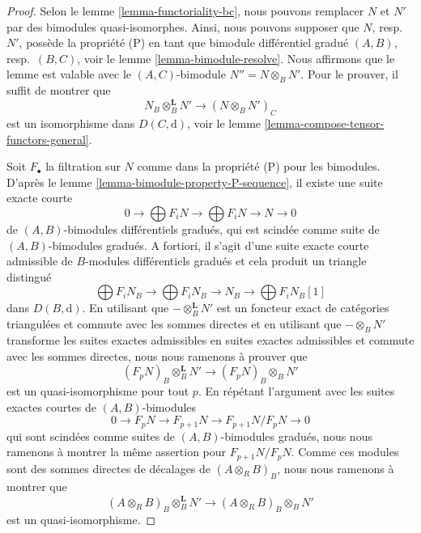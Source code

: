 \begin{proof}
Selon le lemme \ref{lemma-functoriality-bc}, nous pouvons remplacer $N$ et $N'$ par
des bimodules quasi-isomorphes. Ainsi, nous pouvons supposer que $N$, resp.\ $N'$,
possède la propriété (P) en tant que bimodule différentiel gradué $(A, B)$,
resp.\ $(B, C)$,
voir le lemme \ref{lemma-bimodule-resolve}. Nous affirmons que le
lemme est valable avec le $(A, C)$-bimodule $N'' = N \otimes_B
N'$. Pour le prouver, il suffit de montrer que
$$
N_B \otimes_B^\mathbf{L} N' \longrightarrow (N \otimes_B N')_C
$$
est un isomorphisme dans $D(C, \text{d})$,
voir le lemme \ref{lemma-compose-tensor-functors-general}.

\medskip\noindent
Soit $F_\bullet$ la filtration sur $N$ comme dans la propriété (P) pour les bimodules.
D'après le lemme
\ref{lemma-bimodule-property-P-sequence}, il existe une suite exacte courte
$$
0 \to
\bigoplus\nolimits F_iN \to
\bigoplus\nolimits F_iN \to N \to 0
$$
de $(A, B)$-bimodules différentiels gradués, qui est scindée comme suite
de $(A, B)$-bimodules gradués. A fortiori, il s'agit d'une suite exacte
courte admissible de $B$-modules différentiels gradués et cela produit un triangle
distingué
$$
\bigoplus\nolimits F_iN_B \to
\bigoplus\nolimits F_iN_B \to N_B \to
\bigoplus\nolimits F_iN_B[1]
$$
dans $D(B, \text{d})$. En utilisant que $- \otimes_B^\mathbf{L} N'$
est un foncteur exact de catégories triangulées et commute avec les
sommes directes et en utilisant que $- \otimes_B N'$ transforme les
suites exactes admissibles en suites exactes admissibles et commute
avec les sommes directes, nous nous ramenons à prouver
que
$$
(F_pN)_B \otimes_B^\mathbf{L} N' \longrightarrow (F_pN)_B \otimes_B N'
$$
est un quasi-isomorphisme pour tout $p$. En répétant
l'argument avec les suites exactes courtes de $(A, B)$-bimodules
$$
0 \to F_pN \to F_{p + 1}N \to F_{p + 1}N/F_pN \to 0
$$
qui sont scindées comme suites de $(A, B)$-bimodules
gradués, nous nous ramenons à montrer la même assertion pour $F_{p +
1}N/F_pN$. Comme ces modules sont des sommes directes de décalages de $(A \otimes_R B)_B$,
nous nous ramenons à montrer que
$$
(A \otimes_R B)_B \otimes_B^\mathbf{L} N'
\longrightarrow
(A \otimes_R B)_B \otimes_B N'
$$
est un quasi-isomorphisme.


\end{proof}
